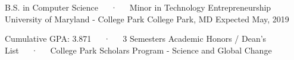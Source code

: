 

\begin{cventries}

  \cventry
    {B.S. in  Computer Science~~~·~~~Minor in Technology Entrepreneurship} %
    {University of Maryland - College Park} %
    {College Park, MD} %
    {Expected May, 2019} %
    {
      \begin{cvitems} %
        \item {Cumulative GPA: 3.871~~~·~~~3 Semesters Academic Honors / Dean's List~~~·~~~College Park Scholars Program - Science and Global Change}
      \end{cvitems}
    }



\end{cventries}
